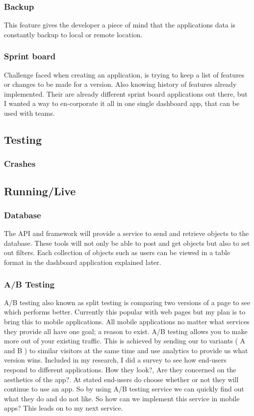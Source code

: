\subsubsection{Backup}
This feature gives the developer a piece of mind that the applications data is constantly backup to local or remote location.

\subsubsection{Sprint board}
Challenge faced when creating an application, is trying to keep a list of features or changes to be made for a version. Also knowing history of features already implemented. Their are already different sprint board applications out there, but I wanted a way to en-corporate it all in one single dashboard app, that can be used with teams.


\subsection{Testing}

\subsubsection{Crashes}

\subsection{Running/Live}

\subsubsection{Database}
The API and framework will provide a service to send and retrieve objects to the  database. These tools will not only be able to post and get objects but also to set out filters. Each collection of objects such as users can be viewed in a table format in the dashboard application explained later.

\subsubsection{A/B Testing}
A/B testing also known as split testing is comparing two versions of a page to see which performs better. Currently this popular with web pages but my plan is to bring this to mobile applications. All mobile applications no matter what services they provide all have one goal; a reason to exist. A/B testing allows you to make more out of your existing traffic. This is achieved by sending our to variants ( A and B ) to similar visitors at the same time and use analytics to provide us what version wins. Included in my research, I did a survey to see how end-users respond to different applications. How they look?, Are they concerned on the aesthetics of the app?. At stated end-users do choose whether or not they will continue to use an app. So by using A/B testing service we can quickly find out what they do and do not like. So how can we implement this service in mobile apps? This leads on to my next service.

